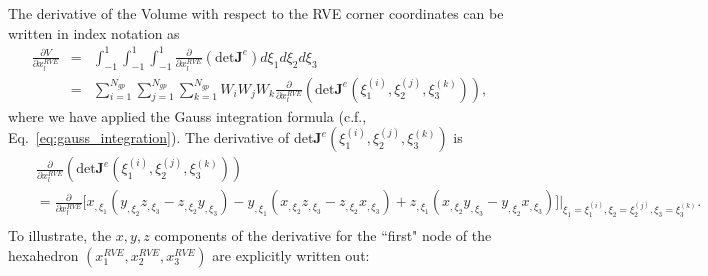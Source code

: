 \documentclass[12pt,aps,pre]{revtex4}
\begin{document}
The derivative of the Volume with respect to the RVE corner coordinates can be written in index notation as
%
\begin{eqnarray}
\frac{\partial V}{\partial x_l^{RVE}} &=& \int_{-1}^1 \int_{-1}^1 \int_{-1}^1 \frac{\partial}{\partial x_l^{RVE}} \left(\text{det}\pmb{J}^e\right) d\xi_1 d\xi_2 d\xi_3 \nonumber\\
%
&=& \sum_{i=1}^{N_{gp}} \sum_{j=1}^{N_{gp}} \sum_{k=1}^{N_{gp}} W_i W_j W_k \frac{\partial}{\partial x_l^{RVE}} \left(\text{det}\pmb{J}^e(\xi_1^{(i)},\xi_2^{(j)},\xi_3^{(k)})\right),
\label{eq:dVdvl}
\end{eqnarray}
%
where we have applied the Gauss integration formula (c.f., Eq.\ \eqref{eq:gauss_integration}). The derivative of det$\pmb{J}^e(\xi_1^{(i)},\xi_2^{(j)},\xi_3^{(k)})$ is 
%
\begin{eqnarray}
&&\frac{\partial}{\partial x_l^{RVE}}\left(\text{det}\pmb{J}^e(\xi_1^{(i)},\xi_2^{(j)},\xi_3^{(k)})\right) \nonumber\\
%
&&= \frac{\partial}{\partial x_l^{RVE}}\bigg[x_{,\xi_1}\left(y_{,\xi_2}z_{,\xi_3} - z_{,\xi_2}y_{,\xi_3} \right) - y_{,\xi_1}\left(x_{,\xi_2}z_{,\xi_3}-z_{,\xi_2}x_{,\xi_3} \right) + z_{,\xi_1}\left(x_{,\xi_2}y_{,\xi_3}-y_{,\xi_2}x_{,\xi_3} \right)\bigg] \bigg |_{\xi_1 = \xi_1^{(i)}, \xi_2 = \xi_2^{(j)}, \xi_3 = \xi_3^{(k)}}.  \nonumber\\
\end{eqnarray}
%
To illustrate, the $x, y, z$ components of the derivative for the ``first" node of the hexahedron $(x_1^{RVE},x_2^{RVE}, x_3^{RVE})$ are explicitly written out:
%
\end{document}
